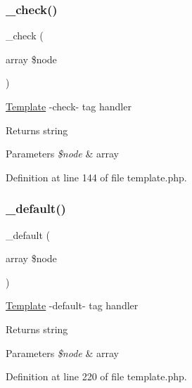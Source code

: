 \subsubsection{\texorpdfstring{\+\_\+check()}{\_check()}}
{\footnotesize\ttfamily \+\_\+check (\begin{DoxyParamCaption}\item[{array}]{\$node }\end{DoxyParamCaption})\hspace{0.3cm}{\ttfamily [protected]}}

\hyperlink{class_template}{Template} -\/check-\/ tag handler \begin{DoxyReturn}{Returns}
string 
\end{DoxyReturn}

\begin{DoxyParams}{Parameters}
{\em \$node} & array \\
\hline
\end{DoxyParams}


Definition at line 144 of file template.\+php.

\hypertarget{class_template_a3d2700d4b385c03361417f50f13e8985}{}\label{class_template_a3d2700d4b385c03361417f50f13e8985} 
\subsubsection{\texorpdfstring{\+\_\+default()}{\_default()}}
{\footnotesize\ttfamily \+\_\+default (\begin{DoxyParamCaption}\item[{array}]{\$node }\end{DoxyParamCaption})\hspace{0.3cm}{\ttfamily [protected]}}

\hyperlink{class_template}{Template} -\/default-\/ tag handler \begin{DoxyReturn}{Returns}
string 
\end{DoxyReturn}

\begin{DoxyParams}{Parameters}
{\em \$node} & array \\
\hline
\end{DoxyParams}


Definition at line 220 of file template.\+php.

\hypertarget{class_template_af5abab1b9b7dd5911927de68b50b74da}{}\label{class_template_af5abab1b9b7dd5911927de68b50b74da} 
